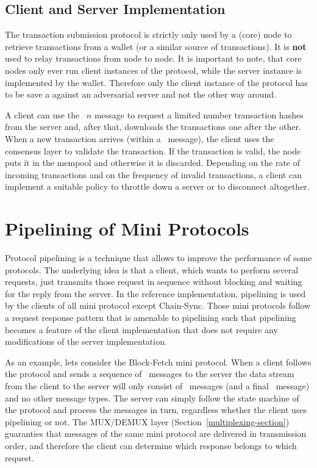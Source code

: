 \documentclass{report}
\theoremstyle{definition}{
  \newtheorem{lemma}{Lemma}[section] %
  \newtheorem{definition}[lemma]{Definition}
}
\theoremstyle{theorem}{
  \newtheorem{invariant}[lemma]{Invariant}
  \newtheorem{proofobligation}[lemma]{Proof Obligation}
}
\numberwithin{equation}{lemma}
\begin{document}
\subsection{Client and Server Implementation}
The transaction submission protocol is strictly only used
by a (core) node to retrieve transactions from a wallet (or a similar source of transactions).
It is {\bf not} used to relay transactions from node to node.
It is important to note, that core nodes only ever run client instances of the protocol,
while the server instance is implemented by the wallet.
Therefore only the client instance of the protocol has to be save a against an adversarial server
and not the other way around.

A client can use the \GetHashes~$n$ message to request a limited number transaction hashes from the server
and, after that, downloads the transactions one after the other.
When a new transaction arrives (within a \Tx~message), the client uses the consensus layer to
validate the transaction.
If the transaction is valid, the node puts it in the mempool and otherwise it is discarded.
Depending on the rate of incoming transactions and on the frequency of invalid transactions,
a client can implement a suitable policy to throttle down a server or to disconnect altogether.

\section{Pipelining of Mini Protocols}
Protocol pipelining is a technique that allows to improve the performance of some protocols.
The underlying idea is that a client, which wants to perform several requests,
just transmits those request in sequence without blocking and waiting for the reply from the server.
In the reference implementation, pipelining is used by the clients of all mini protocol except Chain-Sync.
Those mini protocols follow a request response pattern that is amenable to pipelining such
that pipelining becomes a feature of the client implementation that does not require any
modifications of the server implementation.

As an example, lets consider the Block-Fetch mini protocol.
When a client follows the protocol and sends a sequence of \RequestRange~messages to the server
the data stream from the client to the server will only consist of \RequestRange~messages
(and a final \ClientDone~message) and no other message types.
The server can simply follow the state machine of the protocol and process the messages in turn,
regardless whether the client uses pipelining or not.
The MUX/DEMUX layer (Section~\ref{multiplexing-section}) guaranties that messages of the same mini protocol
are delivered in transmission order, and therefore the client can determine
which response belongs to which request.
\end{document}
